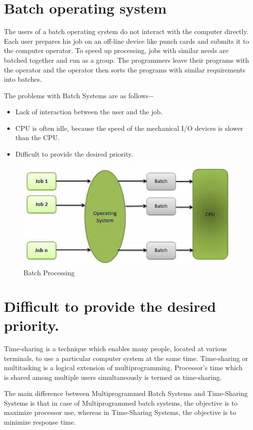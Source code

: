\documentclass[a4paper,10pt]{article}
\begin{document}
  \section{Batch operating system}
  The users of a batch operating system do not interact with the computer directly. Each user prepares his job on an off-line device like punch cards and submits it to the computer operator. To speed up processing, jobs with similar needs are batched together and run as a group. The programmers leave their programs with the operator and the operator then sorts the programs with similar requirements into batches.
  
The problems with Batch Systems are as follows$-$
  \begin{itemize}
    \item Lack of interaction between the user and the job.
    \item CPU is often idle, because the speed of the mechanical I/O devices is slower than the CPU.
    \item Difficult to provide the desired priority.
  \end{itemize}
  \begin{figure}[h]
  \centering
 \includegraphics{batch}
\caption{Batch Processing}
\end{figure}
  \newpage
  
  \section{Difficult to provide the desired priority.}
  Time-sharing is a technique which enables many people, located at various terminals, to use a particular computer system at the same time. Time-sharing or multitasking is a logical extension of multiprogramming. Processor's time which is shared among multiple users simultaneously is termed as time-sharing.
  
The main difference between Multiprogrammed Batch Systems and Time-Sharing Systems is that in case of Multiprogrammed batch systems, the objective is to maximize processor use, whereas in Time-Sharing Systems, the objective is to minimize response time.
\end{document}
